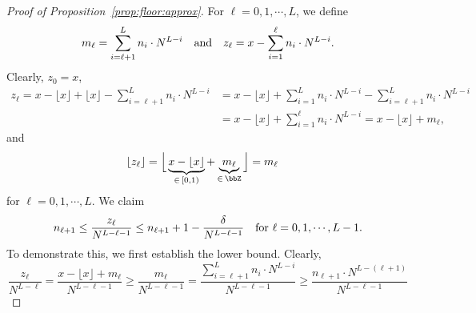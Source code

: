 \documentclass[11pt,a4paper]{article}
\begin{document}
\begin{proof}[Proof of Proposition~\ref{prop:floor:approx}]
        For $\ell=0,1,\cdots,L$, we define
    \begin{equation*}
    m_\ell = \sum_{i=\ell+1}^{L}
    n_i\cdot N^{L-i}\quad \textnormal{and}\quad
        z_\ell = x- \sum_{i=1}^{\ell}
    n_i\cdot N^{L-i}.
\end{equation*}
Clearly, $z_0=x$,
\begin{equation*}
\begin{split}
    z_\ell
    =
    x - \lfloor x\rfloor + \lfloor  x\rfloor - \sum_{i=\ell+1}^{L}
    n_i\cdot N^{L-i} 
   & =
   x - \lfloor x\rfloor + \sum_{i=1}^{L}
    n_i\cdot N^{L-i} 
    - \sum_{i=\ell+1}^{L}
    n_i\cdot N^{L-i} 
   \\& =x - \lfloor x\rfloor + \sum_{i=1}^{\ell}
    n_i\cdot N^{L-i} 
   =x - \lfloor x\rfloor + m_\ell,
\end{split}
\end{equation*}
and
\begin{equation*}
\begin{split}
        \lfloor z_\ell\rfloor
    =
    \Big\lfloor 
    \underbrace{x - \lfloor x\rfloor}_{\in\, [0,1)} + \underbrace{m_\ell}_{\in\, \bbZ}
    \Big\rfloor
   & =
    m_\ell
\end{split}
\end{equation*}
for $\ell=0,1,\cdots,L$.
We claim 
\begin{equation}\label{eq:z:ell:lower:upper:bounds}
    n_{\ell+1} \le \frac{z_\ell}{N^{L-\ell-1}}\le n_{\ell+1}+1 -\frac{\delta}{N^{L-\ell-1}}\quad \textnormal{for $\ell=0,1,\mathinner{\mkern-0.1mu\cdotp\mkern-0.3mu\cdotp\mkern-0.3mu\cdotp\mkern-0.1mu},L-1$}.
\end{equation}
To demonstrate this, we first establish the lower bound. Clearly,
\begin{equation*}
    \frac{z_\ell}{N^{L-\ell}}
    =\frac{x - \lfloor x\rfloor + m_\ell}{N^{L-\ell-1}}
    \ge \frac{ m_\ell}{N^{L-\ell-1}}
    = \frac{ \sum_{i=\ell+1}^{L}
    n_i\cdot N^{L-i}}{N^{L-\ell-1}}
    \ge \frac{ 
    n_{\ell+1}\cdot N^{L-(\ell+1)}}{N^{L-\ell-1}}

\end{equation*}
\end{proof}
\end{document}
